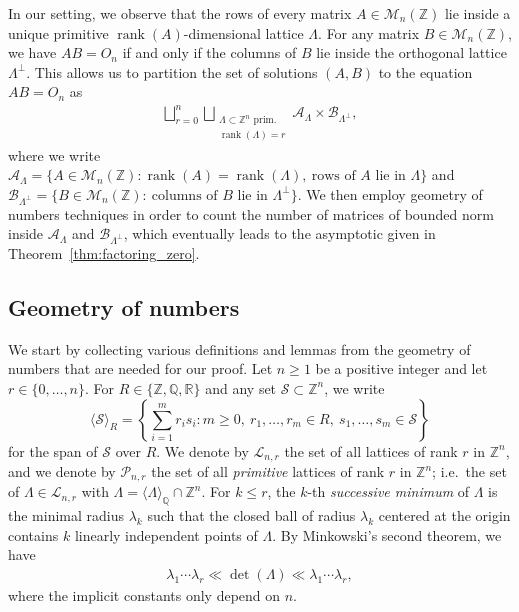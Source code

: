 \documentclass[11pt,reqno]{amsart}
\theoremstyle{definition}
\theoremstyle{remark}
\numberwithin{equation}{section}
\numberwithin{thm}{section}
\numberwithin{table}{section}
\def \Q {{\mathbb Q}}
\def \R {{\mathbb R}}
\def \Z {{\mathbb Z}}
\DeclareMathOperator{\rank}{rank}
\begin{document}
In our setting, we observe that the rows of every matrix $A \in \mathcal{M}_n(\Z)$ lie inside a unique primitive $\rank(A)$-dimensional lattice $\Lambda$. For any matrix $B \in \mathcal{M}_n(\Z)$, we have $AB = O_n$ if and only if the columns of $B$ lie inside the orthogonal lattice $\Lambda^\perp$. This allows us to partition the set of solutions $(A,B)$ to the equation $AB = O_n$ as 
\begin{align}\label{eq:partitionlatticesAB}
\bigsqcup_{r=0}^n
    \bigsqcup_{\substack{\Lambda \subset \Z^n \text{ prim.} \\
    \rank(\Lambda)=r}}  
\mathcal{A}_{\Lambda} \times
\mathcal{B}_{\Lambda^\perp},
\end{align}
where we write $\mathcal{A}_{\Lambda} = \{ A \in \mathcal{M}_n(\Z): \rank(A)=\rank(\Lambda),~\text{rows of $A$ lie in $\Lambda$}\} $ and $ \mathcal{B}_{\Lambda^\perp} =
    \{ B \in \mathcal{M}_n(\Z): ~\text{columns of $B$ lie in $\Lambda^\perp$}\}$.
    We then employ geometry of numbers techniques in order to
    count the number of matrices of bounded norm inside $\mathcal{A}_{\Lambda}$ and $\mathcal{B}_{\Lambda^\perp}$, which eventually leads to the asymptotic given in Theorem~\ref{thm:factoring_zero}.




\subsection{Geometry of numbers}

We start by collecting various definitions and lemmas from the geometry of numbers that are needed for our proof. 
Let $n \ge 1$ be a positive integer and let $r \in \{0,\ldots,n\}$. 
For $R \in \{\Z, \Q, \R \}$ and any set $\mathcal{S} \subset \Z^n$, we write 
\[
    \langle \mathcal{S} \rangle_R = \left\{ \sum_{i=1}^m r_is_i: m\ge0,~ r_1,\ldots,r_m \in R,~s_1,\ldots,s_m \in \mathcal{S} \right\}
\]
for the span of $\mathcal{S}$ over $R$. 
We denote by $\mathcal{L}_{n,r}$ the set of all lattices of rank $r$ in $\Z^n$, and we denote by $\mathcal{P}_{n,r}$ the set of all {\it primitive} lattices of rank $r$ in $\Z^n$; i.e.~the set of  $\Lambda \in \mathcal{L}_{n,r}$ with $\Lambda = \langle \Lambda \rangle_{\Q} \cap \Z^n$. 
For $k \le r$, the $k$-th {\it successive minimum} of $\Lambda$ is the minimal radius $\lambda_k$ such that the closed ball of radius $\lambda_k$ centered at the origin contains $k$ linearly independent points of $\Lambda$. By Minkowski's second theorem, we have 
\begin{align}\label{eq:minkowsi2thm}
        \lambda_1 \cdots \lambda_r \ll \det(\Lambda)
    \ll \lambda_1 \cdots \lambda_r,
\end{align}
where the implicit constants only depend on $n$.
\end{document}
